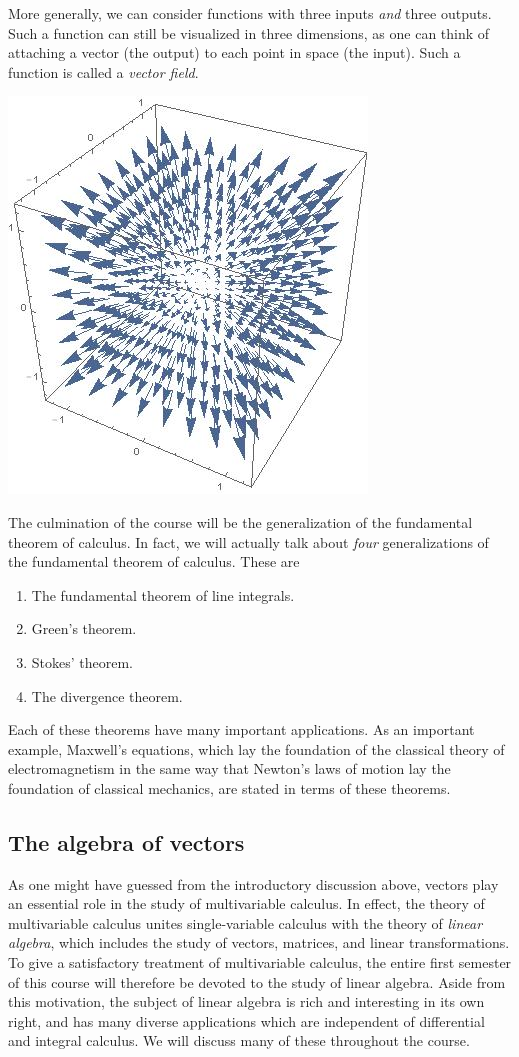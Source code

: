 \documentclass[12pt,letterpaper,reqno]{article}
\numberwithin{equation}{section}
\newcommand{\ti}[1]{\textit{#1}}
\begin{document}
More generally, we can consider functions with three inputs \ti{and} three outputs. Such a function can still be visualized in three dimensions, as one can think of attaching a vector (the output) to each point in space (the input). Such a function is called a \ti{vector field}.
\begin{center}
	\includegraphics[scale=0.5]{figures_mvc/vector_field_example}
\end{center}

The culmination of the course will be the generalization of the fundamental theorem of calculus. In fact, we will actually talk about \ti{four} generalizations of the fundamental theorem of calculus. These are 
\begin{enumerate}
	\item The fundamental theorem of line integrals.
	\item Green's theorem.
	\item Stokes' theorem.
	\item The divergence theorem.
\end{enumerate}
Each of these theorems have many important applications. As an important example, Maxwell's equations, which lay the foundation of the classical theory of electromagnetism in the same way that Newton's laws of motion lay the foundation of classical mechanics, are stated in terms of these theorems. 

\subsection{The algebra of vectors}
As one might have guessed from the introductory discussion above, vectors play an essential role in the study of multivariable calculus. In effect, the theory of multivariable calculus unites single-variable calculus with the theory of \ti{linear algebra}, which includes the study of vectors, matrices, and linear transformations. To give a satisfactory treatment of multivariable calculus, the entire first semester of this course will therefore be devoted to the study of linear algebra. Aside from this motivation, the subject of linear algebra is rich and interesting in its own right, and has many diverse applications which are independent of differential and integral calculus. We will discuss many of these throughout the course.
\end{document}
